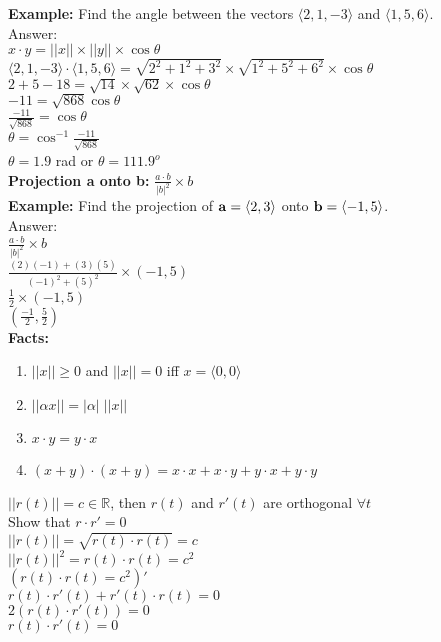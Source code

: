 \documentclass[11pt]{article}
\begin{document}
\begin{enumerate}
\textbf{Example:} Find the angle between the vectors $\langle 2,1,-3 \rangle$ and $ \langle 1,5,6 \rangle$.
 \\
 Answer:
 \\
 $x \cdot y = ||x|| \times ||y|| \times \cos \theta$
 \\
 $\langle 2,1,-3 \rangle \cdot \langle 1,5,6 \rangle = \sqrt{2^2+1^2+3^2} \times \sqrt{1^2+5^2+6^2} \times \cos \theta $
 \\
 $2+5-18= \sqrt{14} \times \sqrt{62} \times \cos \theta $
 \\
 $-11=\sqrt{868} \cos \theta$
 \\
 $\frac{-11}{\sqrt{868}}= \cos \theta $
 \\
 $\theta= \cos^{-1}\frac{-11}{\sqrt{868}} $
 \\
 $\theta= 1.9$ rad or $\theta = 111.9^{o} $
 \\
 \textbf{Projection a onto b:}  $\frac{a \cdot b}{|b|^2} \times b $
 \\
 \textbf{Example:}  Find the projection of ${\bf a} = \langle 2,3 \rangle$ onto ${\bf b} = \langle -1,5 \rangle$.
 \\
 Answer:
 \\
 $\frac{a \cdot b}{|b|^2} \times b $
 \\
 $\frac{(2)(-1)+(3)(5)}{(-1)^2+(5)^2} \times (-1,5) $
 \\
 $\frac{1}{2} \times (-1,5) $
 \\
 $(\frac{-1}{2}, \frac{5}{2}) $
 \\
 \textbf{Facts:}
 \begin{enumerate}
 \item $||x|| \ge 0$ and $||x||=0$ iff $x= \langle 0,0 \rangle$
 \item $||\alpha x||=|\alpha| \; ||x||$
 \item $x \cdot y = y \cdot x$
 \item $(x+y) \cdot (x+y)= x \cdot x + x  \cdot y + y \cdot x + y \cdot y$
 
 \end{enumerate}


 $||r(t)||= c \in \mathbb{R}$,   then $r(t)$ and $r'(t)$ are orthogonal $\forall t$
\\
Show that $r \cdot r' =0$
\\
$||r(t)||=\sqrt{r(t) \cdot r(t)}=c$
\\
$||r(t)||^2=r(t) \cdot r(t) = c^2$
\\
$(r(t) \cdot r(t) = c^2)' $
\\
$r(t) \cdot r'(t) + r'(t) \cdot r(t) = 0$
\\
$2(r(t) \cdot r'(t))=0$
\\
$r(t) \cdot r'(t)=0$




\end{enumerate}
\end{document}
